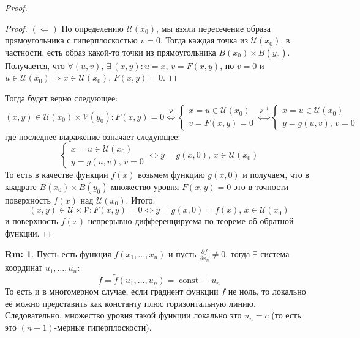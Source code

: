 \documentclass[12pt]{article}
\newcommand{\MU}{\mathcal{U}}
\newcommand{\MV}{\mathcal{V}}
\theoremstyle{definition}
\newtheorem{rem}{Rm:}
\DeclareMathOperator{\const}{\text{const}}
\begin{document}
\begin{proof}
\begin{proof}
		$(\Leftarrow)$ По определению $\MU(x_0)$, мы взяли пересечение образа прямоугольника с гиперплоскостью $v = 0$. Тогда каждая точка из $\MU(x_0)$, в частности, есть образ какой-то точки из прямоугольника $B(x_0) \times B(y_0)$. Получается, что $\forall (u,v), \, \exists \, (x,y) \colon u = x, \, v = F(x,y)$, но $v = 0$ и $u \in \MU(x_0) \Rightarrow x \in \MU(x_0), \, F(x,y) = 0$.
	\end{proof}
	Тогда будет верно следующее:
	$$
		(x,y) \in \MU(x_0) \times \MV(y_0) \colon F(x,y) = 0 \overset{\Psi}{\Leftrightarrow}
		\left\{\begin{array}{l}
			x = u \in \MU(x_0) \\
			v = F(x,y) = 0
		\end{array}\right. 
		\overset{\Psi^{-1}}{\Leftrightarrow}
		\left\{\begin{array}{l}
			x = u \in \MU(x_0) \\
			y = g(u,v), \, v = 0
		\end{array}\right. 
	$$
	где последнее выражение означает следующее:
	$$
		\left\{\begin{array}{l}
			x = u \in \MU(x_0) \\
			y = g(u,v), \, v = 0
		\end{array}\right. 
		\Leftrightarrow y = g(x,0), \, x \in \MU(x_0)
	$$
	То есть в качестве функции $f(x)$ возьмем функцию $g(x,0)$ и получаем, что в квадрате $B(x_0)\times B(y_0)$ множество уровня $F(x,y) = 0$ это в точности поверхность $f(x)$ над $\MU(x_0)$. Итого:
	$$
		(x,y) \in \MU \times \MV \colon F(x,y) = 0 \Leftrightarrow y = g(x,0) = f(x), \, x \in \MU(x_0)
	$$
	и поверхность $f(x)$ непрерывно дифференцируема по теореме об обратной функции.
\end{proof}
\begin{rem}
	Пусть есть функция $f(x_1, \dotsc, x_n)$ и пусть $\tfrac{\partial f}{\partial x_n} \neq 0$, тогда  $\exists$ система координат $u_1, \dotsc, u_n$:
	$$
		f = \widetilde{f}(u_1, \dotsc, u_n) = \const + u_n
	$$
	То есть и в многомерном случае, если градиент функции $f$ не ноль, то локально её можно представить как константу плюс горизонтальную линию. Следовательно, множество уровня такой функции локально это $u_n = c$ (то есть это $(n-1)$-мерные гиперплоскости). 
\end{rem}
\end{document}
